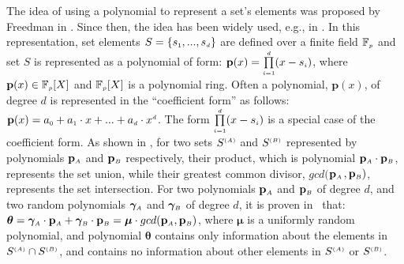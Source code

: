 The idea of using a polynomial to represent a set's elements was proposed by Freedman  \et in \cite{DBLP:conf/eurocrypt/FreedmanNP04}. Since then,   the idea has been widely used,  e.g., in \cite{GhoshS19,DBLP:conf/crypto/KissnerS05}. In this representation, set elements $S=\{s_{\scriptscriptstyle 1},...,s_{\scriptscriptstyle d}\}$ are defined over a finite field $\mathbb{F}_{\scriptscriptstyle p}$ and  set $S$ is represented as a polynomial of   form: $\mathbf{p}(x)=\prod\limits ^{\scriptscriptstyle {d}}_{\scriptscriptstyle i=1}(x-s_{\scriptscriptstyle i})$, where $\mathbf{p}(x) \in \mathbb{F}_{\scriptscriptstyle p}[X]$ and $\mathbb{F}_{\scriptscriptstyle p}[X]$ is a polynomial ring.  Often a   polynomial,  $\mathbf{p}(x)$, of degree $d$ is  represented in the ``coefficient form'' as follows:  $\mathbf{p}(x)=a_{\scriptscriptstyle 0}+a_{\scriptscriptstyle 1}\cdot x+...+ a_{\scriptscriptstyle d}\cdot x^{\scriptscriptstyle d}$. The form $\prod\limits ^{\scriptscriptstyle {d}}_{\scriptscriptstyle i=1}(x-s_{\scriptscriptstyle i})$ is a special case of the coefficient form. As shown in \cite{BonehGHWW13,DBLP:conf/crypto/KissnerS05}, for two sets $S^{\scriptscriptstyle (A)}$ and $S^{\scriptscriptstyle (B)}$ represented by polynomials $\mathbf{p}_{\scriptscriptstyle A}$ and $\mathbf{p}_{\scriptscriptstyle B}$ respectively, their product, which is polynomial $\mathbf{p}_{\scriptscriptstyle A}\cdot \mathbf{p}_{\scriptscriptstyle  B}$,  represents the set union, while their greatest common divisor, $gcd($$\mathbf{p}_{\scriptscriptstyle A}$$,\mathbf{p}_{\scriptscriptstyle B})$, represents the set intersection. For two polynomials $\mathbf{p}_{\scriptscriptstyle A}$ and $\mathbf{p}_{\scriptscriptstyle B}$ of degree $d$, and two random polynomials $\bm\gamma_{\scriptscriptstyle A}$ and  $\bm\gamma_{\scriptscriptstyle B}$ of degree $d$, it is proven in~\cite{BonehGHWW13,DBLP:conf/crypto/KissnerS05} that: $\bm\theta=\bm\gamma_{\scriptscriptstyle A}\cdot \mathbf{p}_{\scriptscriptstyle A}+\bm\gamma_{\scriptscriptstyle B}\cdot\mathbf{p}_{\scriptscriptstyle B}=\bm\mu\cdot gcd(\mathbf{p}_{\scriptscriptstyle A},\mathbf{p}_{\scriptscriptstyle B})$, where $\bm\mu$ is a uniformly random polynomial, and polynomial $\bm\theta$ contains only information about the elements in  $S^{\scriptscriptstyle (A)}\cap S^{\scriptscriptstyle (B)}$, and contains no information about other elements in $S^{\scriptscriptstyle (A)}$ or $S^{\scriptscriptstyle (B)}$.  

